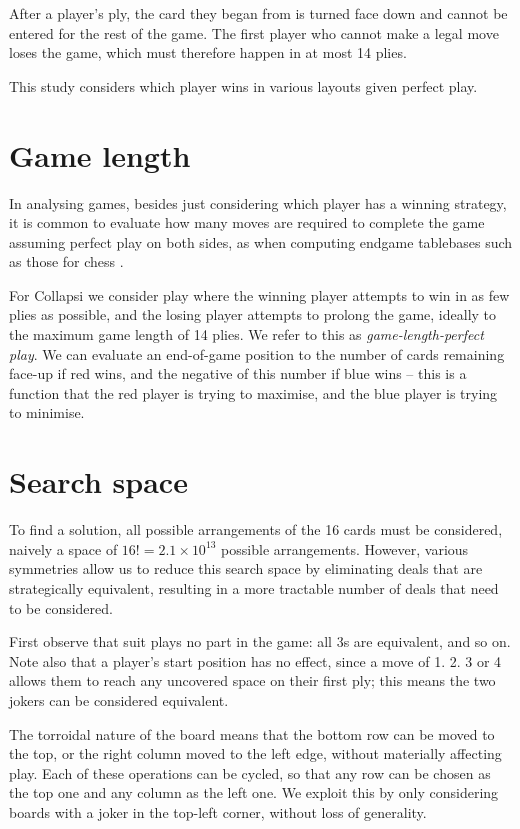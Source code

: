 \documentclass[a4paper, twocolumn]{article}
\begin{document}
After a player's ply, the card they began from is turned face down and cannot
be entered for the rest of the game. The first player who cannot make a legal
move loses the game, which must therefore happen in at most 14 plies.

This study considers which player wins in various layouts given perfect play.


\section{Game length}

In analysing games, besides just considering which player has a winning
strategy, it is common to evaluate how many moves are required to complete the
game assuming perfect play on both sides, as when computing endgame tablebases
such as those for chess \cite{endgame}.

For Collapsi we consider play where the winning player attempts to win in as few
plies as possible, and the losing player attempts to prolong the game, ideally
to the maximum game length of 14 plies. We refer to this as
\textit{game-length-perfect play}. We can evaluate an end-of-game position to
the number of cards remaining face-up if red wins, and the negative of this
number if blue wins -- this is a function that the red player is trying to
maximise, and the blue player is trying to minimise.


\section{Search space}
\label{sec:search-space}

To find a solution, all possible arrangements of the 16 cards must be
considered, naively a space of $16! = 2.1 \times 10^{13}$ possible
arrangements. However, various symmetries allow us to reduce this search space by
eliminating deals that are strategically equivalent, resulting in a more tractable
number of deals that need to be considered.

First observe that suit plays no part in the game: all 3s are equivalent, and so
on. Note also that a player's start position has no effect, since a move of 1. 2. 3 or 4
allows them to reach any uncovered space on their first ply; this means the two
jokers can be considered equivalent.

The torroidal nature of the board means that the bottom row can be moved to the
top, or the right column moved to the left edge, without materially affecting
play. Each of these operations can be cycled, so that any row can be chosen as
the top one and any column as the left one. We exploit this by only considering
boards with a joker in the top-left corner, without loss of generality.
\end{document}

